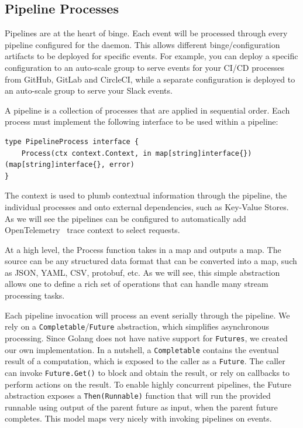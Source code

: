 \documentclass[10pt,twocolumn]{article}
\def\code#1{\texttt{#1}}
\begin{document}
\subsection{Pipeline Processes}\label{sec:pipelineproc}

Pipelines are at the heart of binge.  Each event will be processed through
every pipeline configured for the daemon.  This allows different
binge/configuration artifacts to be deployed for specific events.  For example,
you can deploy a specific configuration to an auto-scale group to serve events
for your CI/CD processes from GitHub, GitLab and CircleCI, while a separate
configuration is deployed to an auto-scale group to serve your Slack
events.

A pipeline is a collection of processes that are applied in sequential order.
Each process must implement the following interface to be used within a pipeline:

\begin{lstlisting}[linewidth=\columnwidth,breaklines=true]
type PipelineProcess interface {
	Process(ctx context.Context, in map[string]interface{}) (map[string]interface{}, error)
}
\end{lstlisting}

The context is used to plumb contextual information through the pipeline, the
individual processes and onto external dependencies, such as Key-Value Stores.
As we will see the pipelines can be configured to automatically add
OpenTelemetry~\cite{OT} trace context to select requests.

At a high level, the Process function takes in a map and outputs a map.  The
source can be any structured data format that can be converted into a map, such
as JSON, YAML, CSV, protobuf, etc.  As we will see, this simple abstraction
allows one to define a rich set of operations that can handle many stream
processing tasks.

Each pipeline invocation will process an event serially through the pipeline.
We rely on a \code{Completable}/\code{Future} abstraction, which simplifies asynchronous
processing.  Since Golang does not have native support for \code{Futures}, we
created our own implementation.  In a nutshell, a \code{Completable} contains the
eventual result of a computation, which is exposed to the caller as a \code{Future}.
The caller can invoke \code{Future.Get()} to block and obtain the result, or rely on
callbacks to perform actions on the result.  To enable highly concurrent
pipelines, the Future abstraction exposes a \code{Then(Runnable)} function
that will run the provided runnable using output of the parent future as input,
when the parent future completes.  This model maps very nicely with invoking
pipelines on events.
\end{document}
